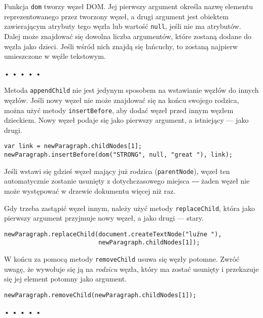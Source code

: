 Funkcja \texttt{dom} tworzy węzeł DOM. Jej pierwszy argument określa nazwę elementu reprezentowanego przez tworzony węzeł, a drugi argument jest obiektem zawierającym atrybuty tego węzła lub wartość \texttt{null}, jeśli nie ma atrybutów. Dalej może znajdować się dowolna liczba argumentów, które zostaną dodane do węzła jako dzieci. Jeśli wśród nich znajdą się łańcuchy, to zostaną najpierw umieszczone w węźle tekstowym.



\begin{center}
• • • • •
\end{center}

  
Metoda \texttt{appendChild} nie jest jedynym sposobem na wstawianie węzłów do innych węzłów. Jeśli nowy węzeł nie może znajdować się na końcu swojego rodzica, można użyć metody \texttt{insertBefore}, aby dodać węzeł przed innym węzłem dzieckiem. Nowy węzeł podaje się jako pierwszy argument, a istniejący — jako drugi.

  
\begin{verbatim} 
var link = newParagraph.childNodes[1];
newParagraph.insertBefore(dom("STRONG", null, "great "), link);
 \end{verbatim}
  
Jeśli wstawi się gdzieś węzeł mający już rodzica (\texttt{parentNode}), węzeł ten automatycznie zostanie usunięty z dotychczasowego miejsca ― żaden węzeł nie może występować w drzewie dokumentu więcej niż raz.

  
Gdy trzeba zastąpić węzeł innym, należy użyć metody \texttt{replaceChild}, która jako pierwszy argument przyjmuje nowy węzeł, a jako drugi — stary.

  
\begin{verbatim} 
newParagraph.replaceChild(document.createTextNode("luźne "),
                          newParagraph.childNodes[1]);
\end{verbatim}
  
W końcu za pomocą metody \texttt{removeChild} usuwa się węzły potomne. Zwróć uwagę, że wywołuje się ją na \emph{rodzicu} węzła, który ma zostać usunięty i przekazuje się jej element potomny jako argument.

  
\begin{verbatim} 
newParagraph.removeChild(newParagraph.childNodes[1]);
\end{verbatim}


\begin{center}
• • • • •
\end{center}

